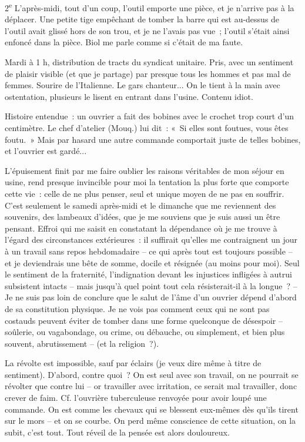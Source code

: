 \documentclass[french,twoside]{book} %
\begin{document}
2\textsuperscript{e} L'après-midi, tout d'un coup, l'outil emporte une pièce, et je n'arrive pas à la déplacer. Une petite tige empêchant de tomber la barre qui est au-dessus de l'outil avait glissé hors de son trou, et je ne l'avais pas vue ; l'outil s'était ainsi enfoncé dans la pièce. Biol me parle comme si c'était de ma faute.\par
Mardi à 1 h, distribution de tracts du syndicat unitaire. Pris, avec un sentiment de plaisir visible (et que je partage) par presque tous les hommes et pas mal de femmes. Sourire de l'Italienne. Le gars chanteur... On le tient à la main avec ostentation, plusieurs le lisent en entrant dans l'usine. Contenu idiot.\par
Histoire entendue : un ouvrier a fait des bobines avec le crochet trop court d'un centimètre. Le chef d'atelier (Mouq.) lui dit : « Si elles sont foutues, vous êtes foutu. » Mais par hasard une autre commande comportait juste de telles bobines, et l'ouvrier est gardé...\par
L'épuisement finit par me faire oublier les raisons véritables de mon séjour en usine, rend presque invincible pour moi la tentation la plus forte que comporte cette vie : celle de ne plus penser, seul et unique moyen de ne pas en souffrir. C'est seulement le samedi après-midi et le dimanche que me reviennent des souvenirs, des lambeaux d'idées, que je me souviens que je suis aussi un être pensant. Effroi qui me saisit en constatant la dépendance où je me trouve à l'égard des circonstances extérieures : il suffirait qu'elles me contraignent un jour à un travail sans repos hebdomadaire – ce qui après tout est toujours possible – et je deviendrais une bête de somme, docile et résignée (au moins pour moi). Seul le sentiment de la fraternité, l'indignation devant les injustices infligées à autrui subsistent intacts – mais jusqu'à quel point tout cela résisterait-il à la longue ? – Je ne suis pas loin de conclure que le salut de l'âme d'un ouvrier dépend d'abord de sa constitution physique. Je ne vois pas comment ceux qui ne sont pas costauds peuvent éviter de tomber dans une forme quelconque de désespoir – soûlerie, ou vagabondage, ou crime, ou débauche, ou simplement, et bien plus souvent, abrutissement – (et la religion ?).\par
La révolte est impossible, sauf par éclairs (je veux dire même à titre de sentiment). D'abord, contre quoi ? On est seul avec son travail, on ne pourrait se révolter que contre lui – or travailler avec irritation, ce serait mal travailler, donc crever de faim. Cf. l'ouvrière tuberculeuse renvoyée pour avoir loupé une commande. On est comme les chevaux qui se blessent eux-mêmes dès qu'ils tirent sur le mors – et on se courbe. On perd même conscience de cette situation, on la subit, c'est tout. Tout réveil de la pensée est alors douloureux.\par
\end{document}
